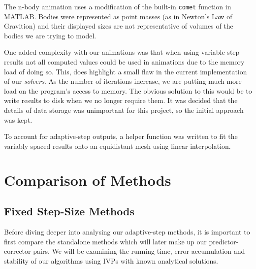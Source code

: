 \documentclass[12pt, twoside]{report}
\theoremstyle{plain}
\theoremstyle{definition}
\theoremstyle{definition}
\begin{document}
        The n-body animation uses a modification of the built-in 
        \texttt{comet} function in MATLAB. Bodies were represented
        as point masses (as in Newton's Law of Gravition) and their displayed
        sizes are not representative of volumes of the bodies we are trying to model.
        

        One added complexity with our animations was that when using variable
        step results not all computed values could be used in animations due to
        the memory load of doing so. This, does highlight a small flaw in the 
        current implementation of our \textit{solvers}. As the number of 
        iterations increase, we are putting much more load on the program's access
        to memory. The obvious solution to this would be to write results to disk
        when we no longer require them. It was decided that the details of data
        storage was unimportant for this project, so the initial approach 
        was kept. 

        To account for adaptive-step outputs, a helper function was written to fit the
        variably spaced results onto an equidistant mesh using linear interpolation.


\chapter{Comparison of Methods}
\label{4_comparison}
    
    \section{Fixed Step-Size Methods}
    \label{4_fixed}
        Before diving deeper into analysing our adaptive-step methods, it
        is important to first compare the standalone methods which will later
        make up our predictor-corrector pairs. We will be examining the 
        running time, error accumulation and stability of our algorithms using 
        IVPs with known analytical solutions.
\end{document}
